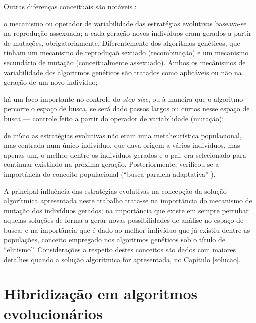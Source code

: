 \documentclass[relatorio,nocolorlinks]{inf-ufg}
\begin{document}
Outras diferen\c{c}as conceituais s\~{a}o not\'{a}veis \cite{DeJong2006}:
\begin{inparaenum}[\itshape 1\upshape)]
\item o mecanismo ou operador de variabilidade das estrat\'{e}gias evolutivas baseava-se na reprodu\c{c}\~{a}o assexuada; a cada gera\c{c}\~{a}o
novos indiv\'{i}duos eram gerados a partir de muta\c{c}\~{o}es, obrigatoriamente. Diferentemente dos algoritmos gen\'{e}ticos, que tinham um
mecanismo de reprodu\c{c}a\~{o} sexuado (recombina\c{c}\~{a}o) e um mecanismo secund\'{a}rio de muta\c{c}\~{a}o (conceitualmente assexuado).
Ambos os mec\^{a}nismos de variabilidade dos algoritmos gen\'{e}ticos s\~{a}o tratados como aplic\'{a}veis ou n\~{a}o na gera\c{c}\~{a}o de um
novo indiv\'{i}duo;
\item h\'{a} um foco importante no controle do \textit{step-size}, ou \`{a} maneira que o algoritmo percorre o espa\c{c}o de busca, se ser\'{a}
dado passos largos ou curtos nesse espa\c{c}o de busca --- controle feito a partir do operador de variabilidade (muta\c{c}\~{a}o);
\item de in\'{i}cio as estrat\'{e}gias evolutivas n\~{a}o eram uma metaheur\'{i}stica populacional, mas centrada num \'{u}nico indiv\'{i}duo,
que dava origem a v\'{a}rios indiv\'{i}duos, mas apenas um, o melhor dentre os indiv\'{i}duos gerados e o pai, era selecionado para continuar
existindo na pr\'{o}xima gera\c{c}\~{a}o. Posteriormente, verificou-se a import\^{a}ncia do conceito populacional (``busca paralela adaptativa''
\cite{DeJong2006}).
\end{inparaenum}

A principal influ\^{e}ncia das estrat\'{e}gias evolutivas na concep\c{c}\~{a}o da solu\c{c}\~{a}o algor\'{i}tmica apresentada neste trabalho
trata-se na import\^{a}ncia do mecanismo de muta\c{c}\~{a}o dos indiv\'{i}duos gerados; na import\^{a}ncia que existe em sempre pertubar aquelas
solu\c{c}\~{o}es de forma a gerar novas possibilidades de an\'{a}lise no espa\c{c}o de busca; e na import\^{a}ncia que \'{e} dado ao melhor
indiv\'{i}duo que j\'{a} existiu dentre as popula\c{c}\~{o}es, conceito empregado nos algoritmos gen\'{e}ticos sob o t\'{i}tulo de ``elitismo''.
Considera\c{c}\~{o}es a respeito destes conceitos s\~{a}o dados com maiores detalhes quando a solu\c{c}\~{a}o algor\'{i}tmica for apresentada,
no Cap\'{i}tulo \ref{solucao}.

\section{Hibridiza\c{c}\~{a}o em algoritmos evolucion\'{a}rios}
\end{document}

